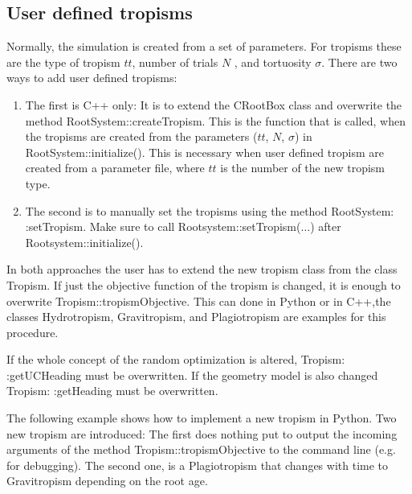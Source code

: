\documentclass[a4paper]{article}
\begin{document}
\subsection{User defined tropisms} \label{sec:usertropism}

Normally, the simulation is created from a set of parameters. For tropisms these are the type of tropism $tt$, number of trials $N$ , and tortuosity $\sigma$.
There are two ways to add user defined tropisms: 

\begin{enumerate}
\item The first is C++ only: It is to extend the CRootBox class and overwrite the method RootSystem::createTropism. 
This is the function that is called, when the tropisms are created from the parameters ($tt$, $N$, $\sigma$) in RootSystem::initialize(). 
This is necessary when user defined tropism are created from a parameter file, where $tt$ is the number of the new tropism type. 
\item The second is to manually set the tropisms using the method RootSystem: :setTropism. Make sure to call Rootsystem::setTropism($\dots$) after Rootsystem::initialize().
\end{enumerate}

In both approaches the user has to extend the new tropism class from the class Tropism. 
If just the objective function of the tropism is changed, it is enough to overwrite Tropism::tropismObjective. 
This can done in Python or in C++,the classes Hydrotropism, Gravitropism, and Plagiotropism are examples for this procedure.

If the whole concept of the random optimization is altered, Tropism: :getUCHeading must be overwritten. 
If the geometry model is also changed Tropism: :getHeading must be overwritten.

The following example shows how to implement a new tropism in Python. Two new tropism are introduced:
The first does nothing put to output the incoming arguments of the method Tropism::tropismObjective to the command line (e.g. for debugging).  
The second one, is a Plagiotropism that changes with time to Gravitropism depending on the root age.


\end{document}
